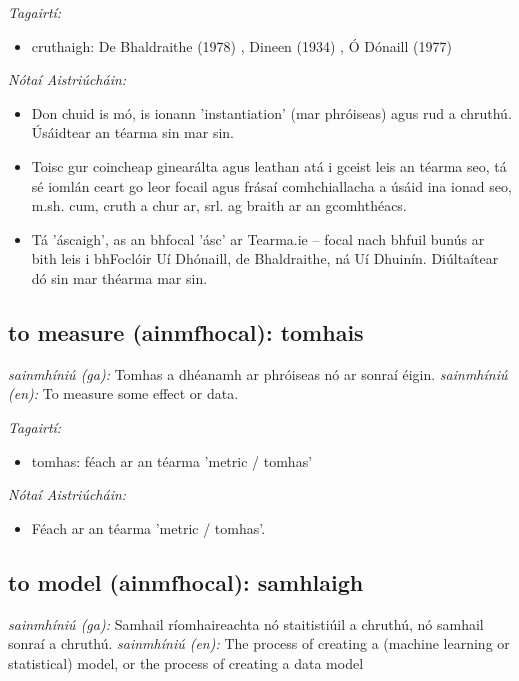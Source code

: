 \documentclass{article}
\begin{document}
 \noindent \textit{Tagairtí:}
\begin{itemize}
	\item cruthaigh: De Bhaldraithe (1978) \cite{de-bhaldraithe}, Dineen (1934) \cite{dineen}, Ó Dónaill (1977) \cite{odonaill}
\end{itemize}

 \noindent \textit{Nótaí Aistriúcháin:}
\begin{itemize}
	\item Don chuid is mó, is ionann 'instantiation' (mar phróiseas) agus rud a chruthú. Úsáidtear an téarma sin mar sin.
	\item Toisc gur coincheap ginearálta agus leathan atá i gceist leis an téarma seo, tá sé iomlán ceart go leor focail agus frásaí comhchiallacha a úsáid ina ionad seo, m.sh. cum, cruth a chur ar, srl. ag braith ar an gcomhthéacs.
	\item Tá 'áscaigh', as an  bhfocal 'ásc' ar Tearma.ie -- focal nach bhfuil bunús ar bith leis i bhFoclóir Uí Dhónaill, de Bhaldraithe, ná Uí Dhuinín. Diúltaítear dó sin mar théarma mar sin.
\end{itemize}


\subsection*{to measure (ainmfhocal): tomhais} 
 \noindent \textit{sainmhíniú (ga):} Tomhas a dhéanamh ar phróiseas nó ar sonraí éigin.
\newline\newline
 \noindent \textit{sainmhíniú (en):} To measure some effect or data.
\newline

 \noindent \textit{Tagairtí:}
\begin{itemize}
	\item tomhas: féach ar an téarma 'metric / tomhas'
\end{itemize}

 \noindent \textit{Nótaí Aistriúcháin:}
\begin{itemize}
	\item Féach ar an téarma 'metric / tomhas'.
\end{itemize}


\subsection*{to model (ainmfhocal): samhlaigh} 
 \noindent \textit{sainmhíniú (ga):} Samhail ríomhaireachta nó staitistiúil a chruthú, nó samhail sonraí a chruthú.
\newline\newline
 \noindent \textit{sainmhíniú (en):} The process of creating a (machine learning or statistical) model, or the process of creating a data model
\newline
\end{document}
